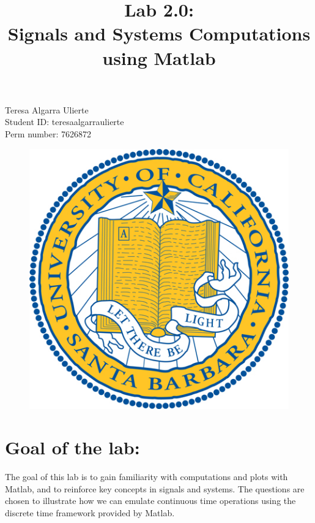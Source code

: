 \documentclass[a4paper,11pt]{article}
\title{\bfseries Lab 2.0: \\ Signals and Systems Computations using Matlab\\}
\date{}
\begin{document}
\renewcommand\contentsname{\vspace{-1cm}}
\maketitle
\lstset{language=Matlab}

\begin{centering}
    Teresa Algarra Ulierte \\
    Student ID: teresaalgarraulierte \\
    Perm number: 7626872 \\
\end{centering}

\vspace{3cm}

\begin{figure}[!ht]
	\centering
	\includegraphics[scale = 5]{images/portada.jpeg}
\end{figure}

\newpage

\section{Goal of the lab:}

The goal of this lab is to gain familiarity with computations and plots with Matlab, and to reinforce key concepts in signals and systems.  The questions are chosen to illustrate how we can emulate continuous time operations using the discrete time framework provided by Matlab.
\end{document}
